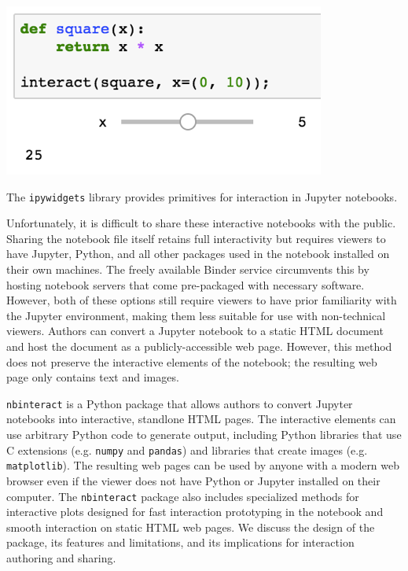 \documentclass[nobib]{tufte-handout}
\newcommand{\code}[1]{\texttt{#1}}
\begin{document}
\begin{marginfigure}%
  \includegraphics[width=\linewidth]{graphics/ipywidgets.png}
  \caption{The \code{ipywidgets} library provides primitives for interaction
  in Jupyter notebooks.}
  \label{fig:ipywidgets}
\end{marginfigure}

Unfortunately, it is difficult to share these interactive notebooks with the
public. Sharing the notebook file itself retains full interactivity but
requires viewers to have Jupyter, Python, and all other packages used in the
notebook installed on their own machines. The freely available Binder service
circumvents this by hosting notebook servers that come pre-packaged with
necessary software. However, both of these options still require viewers to
have prior familiarity with the Jupyter environment, making them less suitable
for use with non-technical viewers. Authors can convert a Jupyter notebook to a
static HTML document and host the document as a publicly-accessible web page.
However, this method does not preserve the interactive elements of the
notebook; the resulting web page only contains text and images.

\code{nbinteract} is a Python package that allows authors to convert Jupyter
notebooks into interactive, standlone HTML pages. The interactive elements can
use arbitrary Python code to generate output, including Python libraries that
use C extensions (e.g. \code{numpy} and \code{pandas}) and libraries that
create images (e.g. \code{matplotlib}). The resulting web pages can be used by
anyone with a modern web browser even if the viewer does not have Python or
Jupyter installed on their computer. The \code{nbinteract} package also
includes specialized methods for interactive plots designed for fast
interaction prototyping in the notebook and smooth interaction on static HTML
web pages. We discuss the design of the package, its features and limitations,
and its implications for interaction authoring and sharing.
\end{document}
